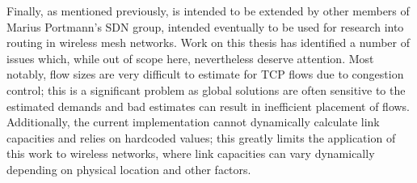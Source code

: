 Finally, as mentioned previously, \thesis{} is intended to be extended by other members of Marius Portmann's SDN group, intended eventually to be used for research into routing in wireless mesh networks. Work on this thesis has identified a number of issues which, while out of scope here, nevertheless deserve attention. Most notably, flow sizes are very difficult to estimate for TCP flows due to congestion control; this is a significant problem as global solutions are often sensitive to the estimated demands and bad estimates can result in inefficient placement of flows. Additionally, the current implementation cannot dynamically calculate link capacities and relies on hardcoded values; this greatly limits the application of this work to wireless networks, where link capacities can vary dynamically depending on physical location and other factors.
